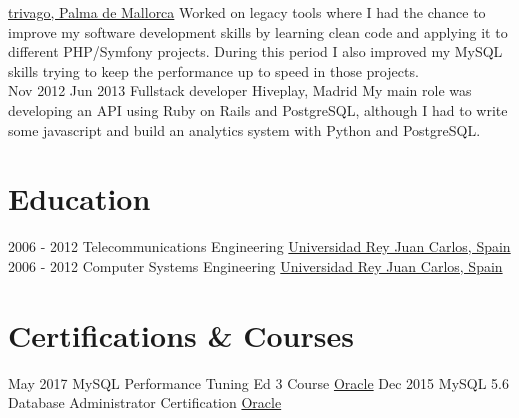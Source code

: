 \documentclass[letterpaper]{twentysecondcv} %
\begin{document}
\begin{twenty}
        {\href{https://www.trivago.com}{trivago, Palma de Mallorca}}
        {Worked on legacy tools where I had the chance to improve my software development skills by learning clean code and applying it to different PHP/Symfony projects. During this period I also improved my MySQL skills trying to keep the performance up to speed in those projects.}
        \\
\twentyitem
    	{Nov 2012}
	{Jun 2013}
        {Fullstack developer}
        {Hiveplay, Madrid}
	{My main role was developing an API using Ruby on Rails and PostgreSQL, although I had to write some javascript and build an analytics system with Python and PostgreSQL.}
        \\
\end{twenty}

\section{Education}

\begin{twenty} %
	\twentyitem
    	{2006 - 2012}
        {}
        {Telecommunications Engineering}
        {\href{https://www.urjc.es/}{Universidad Rey Juan Carlos, Spain}}
        {}
        {}
	\twentyitem
    	{2006 - 2012}
		{}
        {Computer Systems Engineering}
        {\href{https://www.urjc.es/}{Universidad Rey Juan Carlos, Spain}}
        {}
        {}
\end{twenty}

\section{Certifications \& Courses}

\begin{twenty} %
	\twentyitem
    	{May 2017}
	{}
        {MySQL Performance Tuning Ed 3 Course}
        {\href{https://education.oracle.com/pls/web_prod-plq-dad/db_pages.getpage?page_id=609&get_params=dc:D66439,clang:EN}{Oracle}}
        {}
        {}
	\twentyitem
    	{Dec 2015}
        {}
        {MySQL 5.6 Database Administrator Certification}
        {\href{https://education.oracle.com/pls/web_prod-plq-dad/db_pages.getpage?page_id=5001&get_params=p_exam_id:1Z0-883}{Oracle}}
        {}
        {}
\end{twenty}
\end{document}

